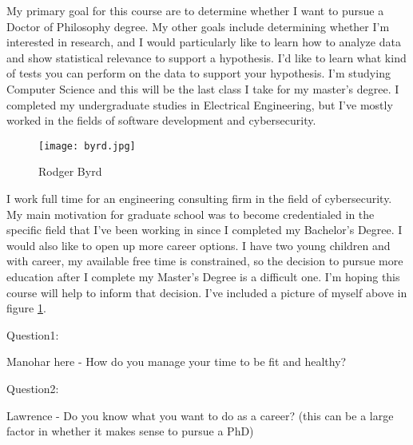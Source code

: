 My primary goal for this course are to determine whether I want to pursue a Doctor of Philosophy degree. My other goals include determining whether I'm interested in research, and I would particularly like to learn how to analyze data and show statistical relevance to support a hypothesis. I'd like to learn what kind of tests you can perform on the data to support your hypothesis. I'm studying Computer Science and this will be the last class I take for my master's degree. I completed my undergraduate studies in Electrical Engineering, but I've mostly worked in the fields of software development and cybersecurity.
\begin{figure}
  \centerline{\texttt{[image: byrd.jpg]}}
  \caption{Rodger Byrd}
  \label{fig:HS}
\end{figure}
I work full time for an engineering consulting firm in the field of cybersecurity. My main motivation for graduate school was to become credentialed in the specific field that I've been working in since I completed my Bachelor's Degree. I would also like to open up more career options. I have two young children and with career, my available free time is constrained, so the decision to pursue more education after I complete my Master's Degree is a difficult one. I'm hoping this course will help to inform that decision. I've included a picture of myself above in figure \ref{fig:HS}.


Question1:

Manohar here - How do you manage your time to be fit and healthy?

Question2:

Lawrence - Do you know what you want to do as a career? (this can be a large factor in whether it makes sense to pursue a PhD)
